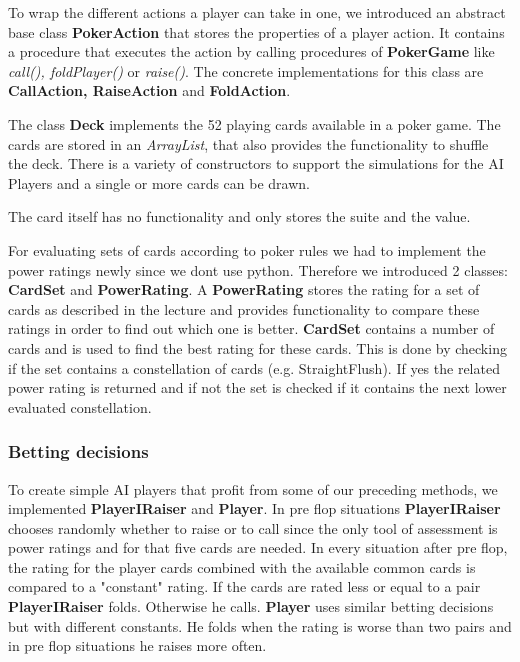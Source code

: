 To wrap the different actions a player can take in one, we introduced an abstract base class \textbf{PokerAction} that stores the properties of a player action. It contains a procedure that executes the action by calling procedures of \textbf{PokerGame} like \textit{call(), foldPlayer()} or \textit{raise()}.
The concrete implementations for this class are \textbf{CallAction, RaiseAction} and \textbf{FoldAction}.

The class \textbf{Deck} implements the 52 playing cards available in a poker game. The cards are stored in an \textit{ArrayList}, that also provides the functionality to shuffle the deck. There is a variety of constructors to support the simulations for the AI Players and a single or more cards can be drawn.

The card itself has no functionality and only stores the suite and the value.

For evaluating sets of cards according to poker rules we had to implement the power ratings newly since we dont use python. Therefore we introduced 2 classes: \textbf{CardSet} and \textbf{PowerRating}.
A \textbf{PowerRating} stores the rating for a set of cards as described in the lecture and provides functionality to compare these ratings in order to find out which one is better.
\textbf{CardSet} contains a number of cards and is used to find the best rating for these cards.
This is done by checking if the set contains a constellation of cards (e.g. StraightFlush). If yes the related power rating is returned and if not the set is checked if it contains the next lower evaluated constellation.

\subsubsection{Betting decisions}

To create simple AI players that profit from some of our preceding methods, we implemented \textbf{PlayerIRaiser} and \textbf{Player}. In pre flop situations \textbf{PlayerIRaiser} chooses randomly whether to raise or to call since the only tool of assessment is power ratings and for that five cards are needed. In every situation after pre flop, the rating for the player cards combined with the available common cards is compared to a "constant" rating. If the cards are rated less or equal to a pair \textbf{PlayerIRaiser} folds. Otherwise he calls. 
\textbf{Player} uses similar betting decisions but with different constants. He folds when the rating is worse than two pairs and in pre flop situations he raises more often.


